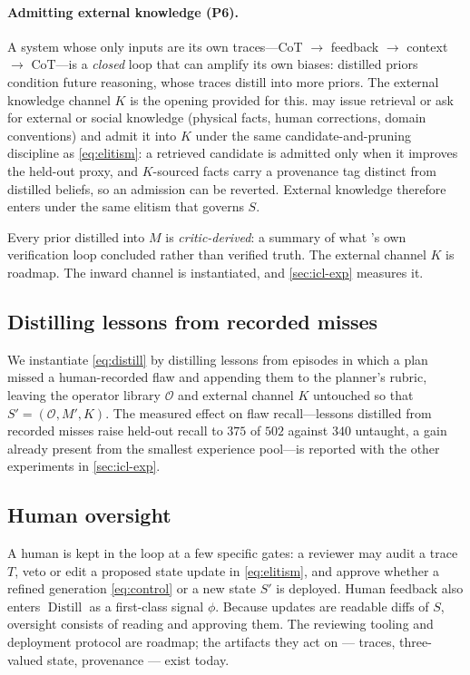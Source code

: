 \paragraph{Admitting external knowledge \textnormal{(P6)}.}
A system whose only inputs are its own traces---CoT $\rightarrow$ feedback
$\rightarrow$ context $\rightarrow$ CoT---is a \emph{closed} loop that can amplify
its own biases: distilled priors condition future reasoning, whose traces distill
into more priors. The external knowledge channel $K$ is the opening provided for this.
\PhyReAct{} may issue retrieval or ask for external or social knowledge (physical
facts, human corrections, domain conventions) and admit it into $K$ under the same
candidate-and-pruning discipline as \eqref{eq:elitism}: a retrieved candidate is admitted only when it improves the held-out proxy, and $K$-sourced facts carry a provenance tag distinct from
distilled beliefs, so an admission can be reverted. External knowledge therefore enters under the
same elitism that governs $S$.

Every prior distilled into $M$ is \emph{critic-derived}: a summary of what \PhyReAct{}'s own
verification loop concluded rather than verified truth. The external channel $K$ is roadmap. The
inward channel is instantiated, and \cref{sec:icl-exp} measures it.

\subsection{Distilling lessons from recorded misses}
\label{sec:selfevolve:measured}
We instantiate \eqref{eq:distill} by distilling lessons from episodes in which a plan missed a
human-recorded flaw and appending them to the planner's rubric, leaving the operator library
$\mathcal{O}$ and external channel $K$ untouched so that $S'=(\mathcal{O},M',K)$. The measured
effect on flaw recall---lessons distilled from recorded misses raise held-out recall to
$375$ of $502$ against $340$ untaught, a gain already present from the smallest experience
pool---is reported with the other experiments in \cref{sec:icl-exp}.

\subsection{Human oversight}
\label{sec:framework:human}

A human is kept in the loop at a few specific gates: a
reviewer may audit a trace $T$, veto or edit a proposed state update in
\eqref{eq:elitism}, and approve whether a refined generation \eqref{eq:control} or
a new state $S'$ is deployed. Human feedback also enters $\operatorname{Distill}$ as a
first-class signal $\phi$. Because updates are readable diffs of $S$, oversight consists of
reading and approving them. The reviewing tooling and deployment protocol are roadmap; the
artifacts they act on --- traces, three-valued state, provenance --- exist today.

